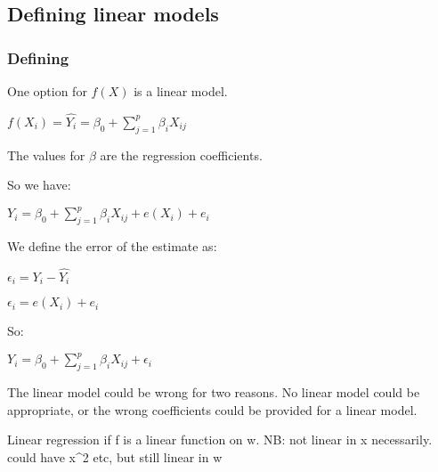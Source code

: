 
\subsection{Defining linear models}

\subsubsection{Defining}

One option for \(f(X)\) is a linear model.

\(f(X_i)=\hat{Y_i}= \beta_0+\sum_{j=1}^p\beta_iX_{ij}\)

The values for \(\beta \) are the regression coefficients.

So we have:

\(Y_i=\beta_0+\sum_{j=1}^p\beta_iX_{ij}+e(X_i)+e_i\)

We define the error of the estimate as:

\(\epsilon_i=Y_i-\hat{Y_i}\)

\(\epsilon_i=e(X_i)+e_i \)

So:

\(Y_i=\beta_0+\sum_{j=1}^p\beta_iX_{ij}+\epsilon_i\)

The linear model could be wrong for two reasons. No linear model could be appropriate, or the wrong coefficients could be provided for a linear model.

Linear regression if f is a linear function on w. NB: not linear in x necessarily. could have x^2 etc, but still linear in w

